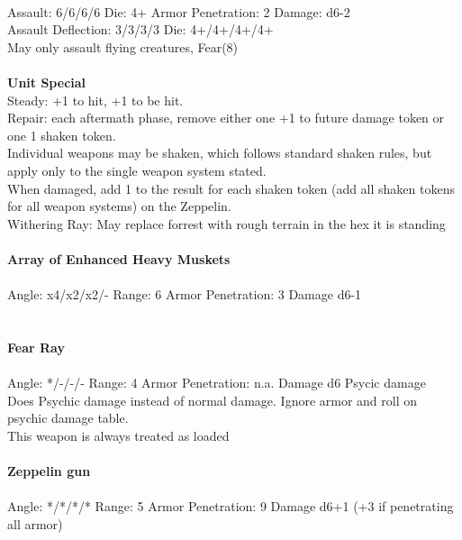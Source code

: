 \ \\
Assault: 6/6/6/6 Die: 4+ Armor Penetration: 2 Damage: d6-2 \\
Assault Deflection: 3/3/3/3 Die: 4+/4+/4+/4+\\
\indent May only assault flying creatures, Fear(8) \\
\ \\

{\bf Unit Special} \\
Steady: +1 to hit, +1 to be hit. \\ Repair: each aftermath phase, remove either one +1 to future damage token or one 1 shaken token. \\ Individual weapons may be shaken, which follows standard shaken rules, but apply only to the single weapon system stated. \\ When damaged, add 1 to the result for each shaken token (add all shaken tokens for all weapon systems) on the Zeppelin. \\ Withering Ray: May replace forrest with rough terrain in the hex it is standing
\ \\
\ \\
{\bf Array of Enhanced Heavy Muskets } \\
\ \\
Angle: x4/x2/x2/- Range: 6 Armor Penetration: 3 Damage d6-1 \\
\indent  \\



\ \\
{\bf Fear Ray } \\
\ \\
Angle: */-/-/- Range: 4 Armor Penetration: n.a. Damage d6 Psycic damage \\
\indent Does Psychic damage instead of normal damage. Ignore armor and roll on psychic damage table. \\ This weapon is always treated as loaded \\



\ \\
{\bf Zeppelin gun } \\
\ \\
Angle: */*/*/* Range: 5 Armor Penetration: 9 Damage d6+1 (+3 if penetrating all armor) \\
\indent  \\






